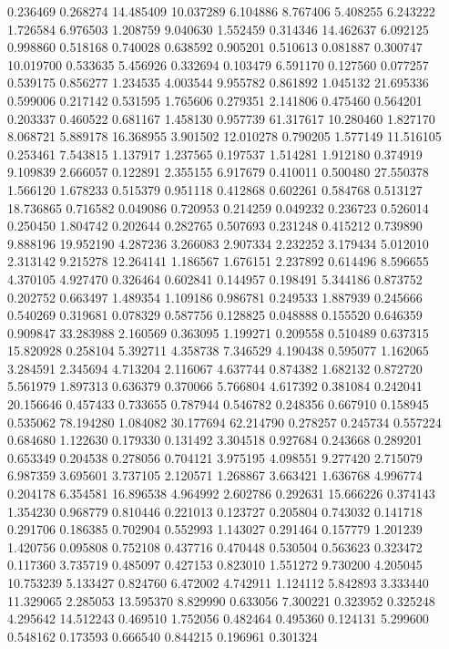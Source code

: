 0.236469
0.268274
14.485409
10.037289
6.104886
8.767406
5.408255
6.243222
1.726584
6.976503
1.208759
9.040630
1.552459
0.314346
14.462637
6.092125
0.998860
0.518168
0.740028
0.638592
0.905201
0.510613
0.081887
0.300747
10.019700
0.533635
5.456926
0.332694
0.103479
6.591170
0.127560
0.077257
0.539175
0.856277
1.234535
4.003544
9.955782
0.861892
1.045132
21.695336
0.599006
0.217142
0.531595
1.765606
0.279351
2.141806
0.475460
0.564201
0.203337
0.460522
0.681167
1.458130
0.957739
61.317617
10.280460
1.827170
8.068721
5.889178
16.368955
3.901502
12.010278
0.790205
1.577149
11.516105
0.253461
7.543815
1.137917
1.237565
0.197537
1.514281
1.912180
0.374919
9.109839
2.666057
0.122891
2.355155
6.917679
0.410011
0.500480
27.550378
1.566120
1.678233
0.515379
0.951118
0.412868
0.602261
0.584768
0.513127
18.736865
0.716582
0.049086
0.720953
0.214259
0.049232
0.236723
0.526014
0.250450
1.804742
0.202644
0.282765
0.507693
0.231248
0.415212
0.739890
9.888196
19.952190
4.287236
3.266083
2.907334
2.232252
3.179434
5.012010
2.313142
9.215278
12.264141
1.186567
1.676151
2.237892
0.614496
8.596655
4.370105
4.927470
0.326464
0.602841
0.144957
0.198491
5.344186
0.873752
0.202752
0.663497
1.489354
1.109186
0.986781
0.249533
1.887939
0.245666
0.540269
0.319681
0.078329
0.587756
0.128825
0.048888
0.155520
0.646359
0.909847
33.283988
2.160569
0.363095
1.199271
0.209558
0.510489
0.637315
15.820928
0.258104
5.392711
4.358738
7.346529
4.190438
0.595077
1.162065
3.284591
2.345694
4.713204
2.116067
4.637744
0.874382
1.682132
0.872720
5.561979
1.897313
0.636379
0.370066
5.766804
4.617392
0.381084
0.242041
20.156646
0.457433
0.733655
0.787944
0.546782
0.248356
0.667910
0.158945
0.535062
78.194280
1.084082
30.177694
62.214790
0.278257
0.245734
0.557224
0.684680
1.122630
0.179330
0.131492
3.304518
0.927684
0.243668
0.289201
0.653349
0.204538
0.278056
0.704121
3.975195
4.098551
9.277420
2.715079
6.987359
3.695601
3.737105
2.120571
1.268867
3.663421
1.636768
4.996774
0.204178
6.354581
16.896538
4.964992
2.602786
0.292631
15.666226
0.374143
1.354230
0.968779
0.810446
0.221013
0.123727
0.205804
0.743032
0.141718
0.291706
0.186385
0.702904
0.552993
1.143027
0.291464
0.157779
1.201239
1.420756
0.095808
0.752108
0.437716
0.470448
0.530504
0.563623
0.323472
0.117360
3.735719
0.485097
0.427153
0.823010
1.551272
9.730200
4.205045
10.753239
5.133427
0.824760
6.472002
4.742911
1.124112
5.842893
3.333440
11.329065
2.285053
13.595370
8.829990
0.633056
7.300221
0.323952
0.325248
4.295642
14.512243
0.469510
1.752056
0.482464
0.495360
0.124131
5.299600
0.548162
0.173593
0.666540
0.844215
0.196961
0.301324
